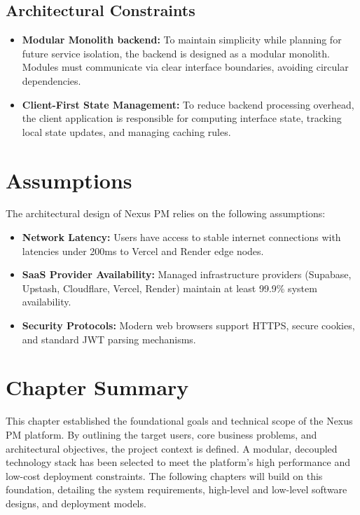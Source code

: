 \subsection{Architectural Constraints}
\begin{itemize}
    \item \textbf{Modular Monolith backend:} To maintain simplicity while planning for future service isolation, the backend is designed as a modular monolith. Modules must communicate via clear interface boundaries, avoiding circular dependencies.
    \item \textbf{Client-First State Management:} To reduce backend processing overhead, the client application is responsible for computing interface state, tracking local state updates, and managing caching rules.
\end{itemize}

\section{Assumptions}
The architectural design of Nexus PM relies on the following assumptions:
\begin{itemize}
    \item \textbf{Network Latency:} Users have access to stable internet connections with latencies under 200ms to Vercel and Render edge nodes.
    \item \textbf{SaaS Provider Availability:} Managed infrastructure providers (Supabase, Upstash, Cloudflare, Vercel, Render) maintain at least 99.9\% system availability.
    \item \textbf{Security Protocols:} Modern web browsers support HTTPS, secure cookies, and standard JWT parsing mechanisms.
\end{itemize}

\section{Chapter Summary}
This chapter established the foundational goals and technical scope of the Nexus PM platform. By outlining the target users, core business problems, and architectural objectives, the project context is defined. A modular, decoupled technology stack has been selected to meet the platform's high performance and low-cost deployment constraints. The following chapters will build on this foundation, detailing the system requirements, high-level and low-level software designs, and deployment models.
